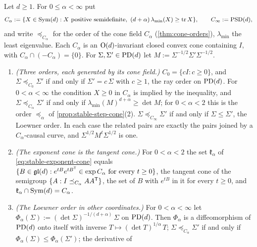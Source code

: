 \begin{proposition}
\label{prop:stable-order-generated}
\leanok
Let $d \ge 1$. For $0 \le \alpha < \infty$ put
\[
  C_\alpha := \{X \in \mathrm{Sym}(d) : X \text{ positive semidefinite},\ (d+\alpha)\,\lambda_{\min}(X) \ge \operatorname{tr} X\} ,
  \qquad C_\infty := \mathrm{PSD}(d) ,
\]
and write $\preceq_{C_\alpha}$ for the order of the cone field $C_\alpha$ (\ref{thm:cone-orders}), $\lambda_{\min}$ the least
eigenvalue. Each $C_\alpha$ is an $\mathrm{O}(d)$-invariant closed convex cone containing $I$, with
$C_\alpha \cap (-C_\alpha) = \{0\}$. For $\Sigma, \Sigma' \in \mathrm{PD}(d)$ let
$M := \Sigma^{-1/2}\Sigma'\Sigma^{-1/2}$.
\begin{enumerate}
\item \emph{(Three orders, each generated by its cone field.)} $C_0 = \{cI : c \ge 0\}$, and
$\Sigma \preceq_{C_0} \Sigma'$ if and only if $\Sigma' = c\,\Sigma$ with $c \ge 1$, the ray order on $\mathrm{PD}(d)$.
For $0 < \alpha < \infty$ the condition $X \ge 0$ in $C_\alpha$ is implied by the inequality, and
$\Sigma \preceq_{C_\alpha} \Sigma'$ if and only if $\lambda_{\min}(M)^{d+\alpha} \ge \det M$; for
$0 < \alpha < 2$ this is the order $\preceq_\alpha$ of \ref{prop:stable-step-cone}(2). $\Sigma \preceq_{C_\infty}
\Sigma'$ if and only if $\Sigma \le \Sigma'$, the Loewner order. In each case the related pairs are exactly
the pairs joined by a $C_\alpha$-causal curve, and $\Sigma^{1/2}M^t\Sigma^{1/2}$ is one.
\item \emph{(The exponent cone is the tangent cone.)} For $0 < \alpha < 2$ the set $\mathfrak k_\alpha$ of
\ref{eq:stable-exponent-cone} equals $\{B \in \mathfrak{gl}(d) : e^{tB}e^{tB^{\mathsf{T}}} \in \exp C_\alpha \text{ for every }
t \ge 0\}$, the tangent cone of the semigroup $\{A : I \preceq_{C_\alpha} AA^{\mathsf{T}}\}$, the set of $B$ with $e^{tB}$ in
it for every $t \ge 0$, and
$\mathfrak k_\alpha \cap \mathrm{Sym}(d) = C_\alpha$.
\item \emph{(The Loewner order in other coordinates.)} For $0 < \alpha < \infty$ let
$\Phi_\alpha(\Sigma) := (\det\Sigma)^{-1/(d+\alpha)}\,\Sigma$ on $\mathrm{PD}(d)$. Then $\Phi_\alpha$ is a
diffeomorphism of $\mathrm{PD}(d)$ onto itself with inverse $T \mapsto (\det T)^{1/\alpha}\,T$;
$\Sigma \preceq_{C_\alpha} \Sigma'$ if and only if $\Phi_\alpha(\Sigma) \le \Phi_\alpha(\Sigma')$; the derivative of

\end{enumerate}
\end{proposition}
